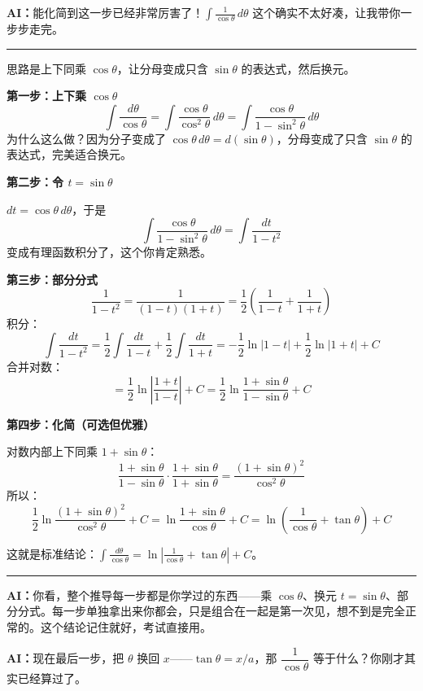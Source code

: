 \documentclass[12pt,a4paper]{ctexart}
\newcommand{\ailine}[1]{\medskip\noindent\textcolor{aicolor}{\textbf{AI：}}#1}
\begin{document}
\ailine{能化简到这一步已经非常厉害了！$\displaystyle\int\frac{1}{\cos\theta}\,d\theta$ 这个确实不太好凑，让我带你一步步走完。}

\bigskip
\hrule
\bigskip


\medskip
思路是上下同乘 $\cos\theta$，让分母变成只含 $\sin\theta$ 的表达式，然后换元。

\bigskip
\noindent\textbf{第一步：上下乘 $\cos\theta$}
\[
  \int\frac{d\theta}{\cos\theta} = \int\frac{\cos\theta}{\cos^2\theta}\,d\theta = \int\frac{\cos\theta}{1-\sin^2\theta}\,d\theta
\]
为什么这么做？因为分子变成了 $\cos\theta\,d\theta = d(\sin\theta)$，分母变成了只含 $\sin\theta$ 的表达式，完美适合换元。

\bigskip
\noindent\textbf{第二步：令 $t = \sin\theta$}

$dt = \cos\theta\,d\theta$，于是
\[
  \int\frac{\cos\theta}{1-\sin^2\theta}\,d\theta = \int\frac{dt}{1-t^2}
\]
变成有理函数积分了，这个你肯定熟悉。

\bigskip
\noindent\textbf{第三步：部分分式}
\[
  \frac{1}{1-t^2} = \frac{1}{(1-t)(1+t)} = \frac{1}{2}\left(\frac{1}{1-t}+\frac{1}{1+t}\right)
\]
积分：
\[
  \int\frac{dt}{1-t^2} = \frac{1}{2}\int\frac{dt}{1-t}+\frac{1}{2}\int\frac{dt}{1+t} = -\frac{1}{2}\ln|1-t|+\frac{1}{2}\ln|1+t|+C
\]
合并对数：
\[
  = \frac{1}{2}\ln\left|\frac{1+t}{1-t}\right|+C = \frac{1}{2}\ln\frac{1+\sin\theta}{1-\sin\theta}+C
\]

\bigskip
\noindent\textbf{第四步：化简（可选但优雅）}

对数内部上下同乘 $1+\sin\theta$：
\[
  \frac{1+\sin\theta}{1-\sin\theta}\cdot\frac{1+\sin\theta}{1+\sin\theta} = \frac{(1+\sin\theta)^2}{\cos^2\theta}
\]
所以：
\[
  \frac{1}{2}\ln\frac{(1+\sin\theta)^2}{\cos^2\theta}+C = \ln\frac{1+\sin\theta}{\cos\theta}+C = \ln\left(\frac{1}{\cos\theta}+\tan\theta\right)+C
\]

\noindent 这就是标准结论：$\displaystyle\int\frac{d\theta}{\cos\theta} = \ln\left|\frac{1}{\cos\theta}+\tan\theta\right|+C$。

\bigskip
\hrule
\bigskip

\ailine{你看，整个推导每一步都是你学过的东西——乘 $\cos\theta$、换元 $t=\sin\theta$、部分分式。每一步单独拿出来你都会，只是组合在一起是第一次见，想不到是完全正常的。这个结论记住就好，考试直接用。}

\ailine{现在最后一步，把 $\theta$ 换回 $x$——$\tan\theta = x/a$，那 $\dfrac{1}{\cos\theta}$ 等于什么？你刚才其实已经算过了。}
\end{document}
